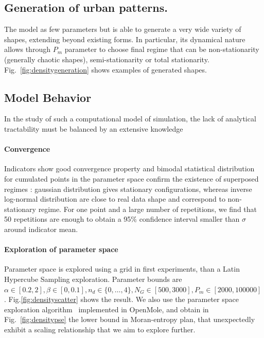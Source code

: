 \documentclass[10pt,letterpaper]{article}
\begin{document}
\subsection*{Generation of urban patterns.}


The model as few parameters but is able to generate a very wide variety of shapes, extending beyond existing forms. In particular, its dynamical nature allows through $P_m$ parameter to choose final regime that can be non-stationarity (generally chaotic shapes), semi-stationarity or total stationarity. Fig.~\ref{fig:densitygeneration} shows examples of generated shapes.




\subsection*{Model Behavior}

In the study of such a computational model of simulation, the lack of analytical tractability must be balanced by an extensive knowledge 

\paragraph{Convergence}




Indicators show good convergence property and bimodal statistical distribution for cumulated points in the parameter space confirm the existence of superposed regimes : gaussian distribution gives stationary configurations, whereas inverse log-normal distribution are close to real data shape and correspond to non-stationary regime. For one point and a large number of repetitions, we find that 50 repetitions are enough to obtain a 95\% confidence interval smaller than $\sigma$ around indicator mean. 



\paragraph{Exploration of parameter space}

Parameter space is explored using a grid in first experiments, than a Latin Hypercube Sampling exploration. Parameter bounds are $\alpha \in [0.2,2],\beta \in [0,0.1],n_d \in \{0,\ldots , 4\}, N_G \in [500,3000], P_m \in [2000,100000]$. Fig.\ref{fig:densityscatter} shows the result. We also use the parameter space exploration algorithm~\cite{10.1371/journal.pone.0138212} implemented in OpenMole, and obtain in Fig.~\ref{fig:densitypse} the lower bound in Moran-entropy plan, that unexpectedly exhibit a scaling relationship that we aim to explore further.
\end{document}
